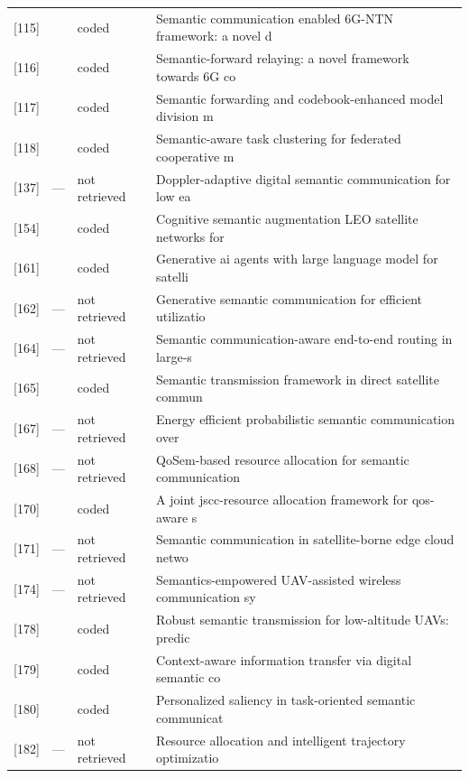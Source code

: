 \begin{longtable}{rll p{52mm}}
{[115]} & \cite{nguyen2024r115} & coded & Semantic communication enabled 6G-NTN framework: a novel d \\
{[116]} & \cite{lin2023r116} & coded & Semantic-forward relaying: a novel framework towards 6G co \\
{[117]} & \cite{huang2026r117} & coded & Semantic forwarding and codebook-enhanced model division m \\
{[118]} & \cite{razlighi2026r118} & coded & Semantic-aware task clustering for federated cooperative m \\
{[137]} & --- & not retrieved & Doppler-adaptive digital semantic communication for low ea \\
{[154]} & \cite{chou2024r154} & coded & Cognitive semantic augmentation LEO satellite networks for \\
{[161]} & \cite{zhang2024r161} & coded & Generative ai agents with large language model for satelli \\
{[162]} & --- & not retrieved & Generative semantic communication for efficient utilizatio \\
{[164]} & --- & not retrieved & Semantic communication-aware end-to-end routing in large-s \\
{[165]} & \cite{huang2026r165} & coded & Semantic transmission framework in direct satellite commun \\
{[167]} & --- & not retrieved & Energy efficient probabilistic semantic communication over \\
{[168]} & --- & not retrieved & QoSem-based resource allocation for semantic communication \\
{[170]} & \cite{nguyenkha2026r170} & coded & A joint jscc-resource allocation framework for qos-aware s \\
{[171]} & --- & not retrieved & Semantic communication in satellite-borne edge cloud netwo \\
{[174]} & --- & not retrieved & Semantics-empowered UAV-assisted wireless communication sy \\
{[178]} & \cite{tian2026r178} & coded & Robust semantic transmission for low-altitude UAVs: predic \\
{[179]} & \cite{joshi2026r179} & coded & Context-aware information transfer via digital semantic co \\
{[180]} & \cite{kang2022r180} & coded & Personalized saliency in task-oriented semantic communicat \\
{[182]} & --- & not retrieved & Resource allocation and intelligent trajectory optimizatio \\

\end{longtable}
